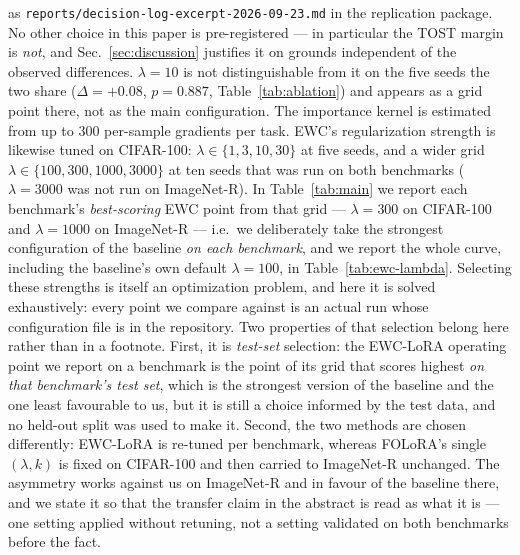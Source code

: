 as \texttt{reports/decision-log-excerpt-2026-09-23.md} in the replication package. No other
choice in this paper is pre-registered --- in particular the TOST margin is
\emph{not}, and Sec.~\ref{sec:discussion} justifies it on grounds independent of the
observed differences. $\lambda{=}10$ is not distinguishable
from it on the five seeds the two share ($\Delta=+0.08$, $p=0.887$,
Table~\ref{tab:ablation}) and appears as a grid point there, not as the main configuration. The importance kernel is estimated
from up to 300 per-sample gradients per task. EWC's regularization strength is likewise
tuned on CIFAR-100: $\lambda\in\{1,3,10,30\}$ at five seeds, and a wider grid
$\lambda\in\{100,300,1000,3000\}$ at ten seeds that was run on both benchmarks
($\lambda{=}3000$ was not run on ImageNet-R). In Table~\ref{tab:main} we report each
benchmark's \emph{best-scoring} EWC point from that grid --- $\lambda{=}300$ on CIFAR-100 and
$\lambda{=}1000$ on ImageNet-R --- i.e.\ we deliberately take the strongest configuration of
the baseline \emph{on each benchmark}, and we report the whole curve, including the
baseline's own default $\lambda{=}100$, in Table~\ref{tab:ewc-lambda}.
Selecting these strengths is itself an optimization problem, and here it is solved
exhaustively: every point we compare against is an actual run whose configuration file is
in the repository.
Two properties of that selection belong here rather than in a footnote. First, it is
\emph{test-set} selection: the EWC-LoRA operating point we report on a benchmark is the
point of its grid that scores highest \emph{on that benchmark's test set}, which is the
strongest version of the baseline and the one least favourable to us, but it is still a
choice informed by the test data, and no held-out split was used to make it. Second, the
two methods are chosen differently: EWC-LoRA is re-tuned per benchmark, whereas FOLoRA's
single $(\lambda,k)$ is fixed on CIFAR-100 and then carried to ImageNet-R unchanged. The
asymmetry works against us on ImageNet-R and in favour of the baseline there, and we state
it so that the transfer claim in the abstract is read as what it is --- one setting applied
without retuning, not a setting validated on both benchmarks before the fact.

